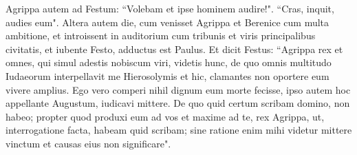 \begin{biblechapter}
\verse Agrippa autem ad Festum: “Volebam et ipse hominem audire!". “Cras, inquit, audies eum". 
\verse Altera autem die, cum venisset Agrippa et Berenice cum multa ambitione, et introissent in auditorium cum tribunis et viris principalibus civitatis, et iubente Festo, adductus est Paulus. 
\verse Et dicit Festus: “Agrippa rex et omnes, qui simul adestis nobiscum viri, videtis hunc, de quo omnis multitudo Iudaeorum interpellavit me Hierosolymis et hic, clamantes non oportere eum vivere amplius. 
\verse Ego vero comperi nihil dignum eum morte fecisse, ipso autem hoc appellante Augustum, iudicavi mittere. 
\verse De quo quid certum scribam domino, non habeo; propter quod produxi eum ad vos et maxime ad te, rex Agrippa, ut, interrogatione facta, habeam quid scribam; 
\verse sine ratione enim mihi videtur mittere vinctum et causas eius non significare". 
\end{biblechapter}

